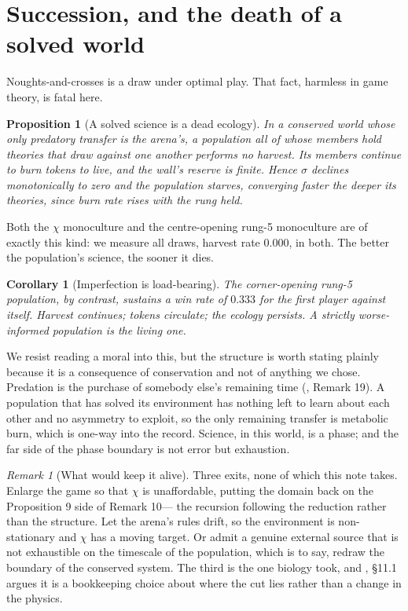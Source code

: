 \documentclass[11pt]{article}
\theoremstyle{definition}
\theoremstyle{plain}
\newtheorem{proposition}[definition]{Proposition}
\newtheorem{corollary}[definition]{Corollary}
\theoremstyle{remark}
\newtheorem{remark}[definition]{Remark}
\begin{document}
\section{Succession, and the death of a solved world}\label{sec:death}

Noughts-and-crosses is a draw under optimal play. That fact, harmless in game
theory, is fatal here.

\begin{proposition}[A solved science is a dead ecology]
In a conserved world whose only predatory transfer is the arena's, a population
all of whose members hold theories that draw against one another performs no
harvest. Its members continue to burn tokens to live, and the wall's reserve is
finite. Hence $\sigma$ declines monotonically to zero and the population starves,
converging faster the deeper its theories, since burn rate rises with the rung
held.
\end{proposition}

Both the $\chi$ monoculture and the centre-opening rung-5 monoculture are of
exactly this kind: we measure all draws, harvest rate $0.000$, in both. The
better the population's science, the sooner it dies.

\begin{corollary}[Imperfection is load-bearing]
The corner-opening rung-5 population, by contrast, sustains a win rate of
$0.333$ for the first player against itself. Harvest continues; tokens
circulate; the ecology persists. A strictly \emph{worse}-informed population is
the living one.
\end{corollary}

We resist reading a moral into this, but the structure is worth stating plainly
because it is a consequence of conservation and not of anything we chose.
Predation is the purchase of somebody else's remaining time (\cite{scientist},
Remark 19). A population that has solved its environment has nothing left to
learn about each other and no asymmetry to exploit, so the only remaining
transfer is metabolic burn, which is one-way into the record. Science, in this
world, is a phase; and the far side of the phase boundary is not error but
exhaustion.

\begin{remark}[What would keep it alive]
Three exits, none of which this note takes. Enlarge the game so that $\chi$ is
unaffordable, putting the domain back on the Proposition 9 side of Remark 10---
the recursion following the reduction rather than the structure. Let the arena's
rules drift, so the environment is non-stationary and $\chi$ has a moving
target. Or admit a genuine external source that is not exhaustible on the
timescale of the population, which is to say, redraw the boundary of the
conserved system. The third is the one biology took, and \cite{scientist},
\S11.1 argues it is a bookkeeping choice about where the cut lies rather than a
change in the physics.
\end{remark}
\end{document}
